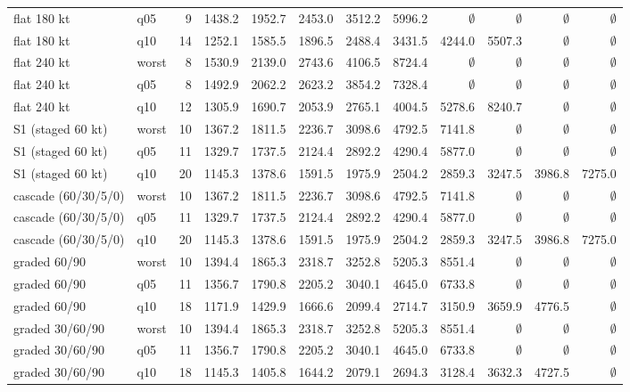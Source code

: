\documentclass[11pt,a4paper]{article}
\begin{document}
\begin{longtable}{llrrrrrrrrrr}
flat 180 kt & q05 & 9 & 1438.2 & 1952.7 & 2453.0 & 3512.2 & 5996.2 & $\emptyset$ & $\emptyset$ & $\emptyset$ & $\emptyset$ \\
flat 180 kt & q10 & 14 & 1252.1 & 1585.5 & 1896.5 & 2488.4 & 3431.5 & 4244.0 & 5507.3 & $\emptyset$ & $\emptyset$ \\
flat 240 kt & worst & 8 & 1530.9 & 2139.0 & 2743.6 & 4106.5 & 8724.4 & $\emptyset$ & $\emptyset$ & $\emptyset$ & $\emptyset$ \\
flat 240 kt & q05 & 8 & 1492.9 & 2062.2 & 2623.2 & 3854.2 & 7328.4 & $\emptyset$ & $\emptyset$ & $\emptyset$ & $\emptyset$ \\
flat 240 kt & q10 & 12 & 1305.9 & 1690.7 & 2053.9 & 2765.1 & 4004.5 & 5278.6 & 8240.7 & $\emptyset$ & $\emptyset$ \\
S1 (staged 60 kt) & worst & 10 & 1367.2 & 1811.5 & 2236.7 & 3098.6 & 4792.5 & 7141.8 & $\emptyset$ & $\emptyset$ & $\emptyset$ \\
S1 (staged 60 kt) & q05 & 11 & 1329.7 & 1737.5 & 2124.4 & 2892.2 & 4290.4 & 5877.0 & $\emptyset$ & $\emptyset$ & $\emptyset$ \\
S1 (staged 60 kt) & q10 & 20 & 1145.3 & 1378.6 & 1591.5 & 1975.9 & 2504.2 & 2859.3 & 3247.5 & 3986.8 & 7275.0 \\
cascade (60/30/5/0) & worst & 10 & 1367.2 & 1811.5 & 2236.7 & 3098.6 & 4792.5 & 7141.8 & $\emptyset$ & $\emptyset$ & $\emptyset$ \\
cascade (60/30/5/0) & q05 & 11 & 1329.7 & 1737.5 & 2124.4 & 2892.2 & 4290.4 & 5877.0 & $\emptyset$ & $\emptyset$ & $\emptyset$ \\
cascade (60/30/5/0) & q10 & 20 & 1145.3 & 1378.6 & 1591.5 & 1975.9 & 2504.2 & 2859.3 & 3247.5 & 3986.8 & 7275.0 \\
graded 60/90 & worst & 10 & 1394.4 & 1865.3 & 2318.7 & 3252.8 & 5205.3 & 8551.4 & $\emptyset$ & $\emptyset$ & $\emptyset$ \\
graded 60/90 & q05 & 11 & 1356.7 & 1790.8 & 2205.2 & 3040.1 & 4645.0 & 6733.8 & $\emptyset$ & $\emptyset$ & $\emptyset$ \\
graded 60/90 & q10 & 18 & 1171.9 & 1429.9 & 1666.6 & 2099.4 & 2714.7 & 3150.9 & 3659.9 & 4776.5 & $\emptyset$ \\
graded 30/60/90 & worst & 10 & 1394.4 & 1865.3 & 2318.7 & 3252.8 & 5205.3 & 8551.4 & $\emptyset$ & $\emptyset$ & $\emptyset$ \\
graded 30/60/90 & q05 & 11 & 1356.7 & 1790.8 & 2205.2 & 3040.1 & 4645.0 & 6733.8 & $\emptyset$ & $\emptyset$ & $\emptyset$ \\
graded 30/60/90 & q10 & 18 & 1145.3 & 1405.8 & 1644.2 & 2079.1 & 2694.3 & 3128.4 & 3632.3 & 4727.5 & $\emptyset$ \\
\end{longtable}
\endgroup
\end{document}
